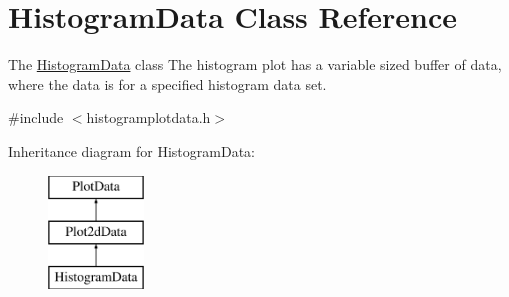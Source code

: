 \hypertarget{class_histogram_data}{\section{\-Histogram\-Data \-Class \-Reference}
\label{class_histogram_data}
}


\-The \hyperlink{class_histogram_data}{\-Histogram\-Data} class \-The histogram plot has a variable sized buffer of data, where the data is for a specified histogram data set.  




{\ttfamily \#include $<$histogramplotdata.\-h$>$}

\-Inheritance diagram for \-Histogram\-Data\-:\begin{figure}[H]
\begin{center}
\leavevmode
\includegraphics[height=3.000000cm]{class_histogram_data}
\end{center}
\end{figure}
